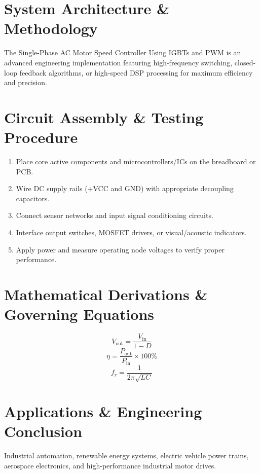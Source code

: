 \documentclass[11pt,a4paper]{article}
\begin{document}
\section{System Architecture \& Methodology}
The Single-Phase AC Motor Speed Controller Using IGBTs and PWM is an advanced engineering implementation featuring high-frequency switching, closed-loop feedback algorithms, or high-speed DSP processing for maximum efficiency and precision.

\section{Circuit Assembly \& Testing Procedure}
\begin{enumerate}
    \item Place core active components and microcontrollers/ICs on the breadboard or PCB.
    \item Wire DC supply rails (+VCC and GND) with appropriate decoupling capacitors.
    \item Connect sensor networks and input signal conditioning circuits.
    \item Interface output switches, MOSFET drivers, or visual/acoustic indicators.
    \item Apply power and measure operating node voltages to verify proper performance.
\end{enumerate}

\section{Mathematical Derivations \& Governing Equations}
\begin{equation}
V_{\text{out}} = \frac{V_{\text{in}}}{1 - D}
\end{equation}
\begin{equation}
\eta = \frac{P_{\text{out}}}{P_{\text{in}}} \times 100\%
\end{equation}
\begin{equation}
f_r = \frac{1}{2\pi \sqrt{L C}}
\end{equation}

\section{Applications \& Engineering Conclusion}
Industrial automation, renewable energy systems, electric vehicle power trains, aerospace electronics, and high-performance industrial motor drives.
\end{document}

